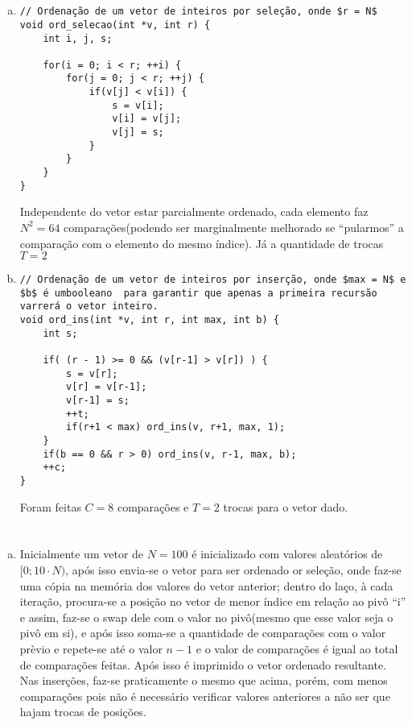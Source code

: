 \documentclass{article}
\begin{document}


\section{}
	\begin{enumerate}[a)]
		\item \mbox{}
			\begin{verbatim}
// Ordenação de um vetor de inteiros por seleção, onde $r = N$
void ord_selecao(int *v, int r) {
	int i, j, s;
				
	for(i = 0; i < r; ++i) {
		for(j = 0; j < r; ++j) {
			if(v[j] < v[i]) {
				s = v[i];
				v[i] = v[j];
				v[j] = s;
			}
		}
	}
}
			\end{verbatim}
			Independente do vetor estar parcialmente ordenado, cada elemento faz $N^2 = 64$ comparações(podendo ser marginalmente melhorado se ``pularmos'' a comparação com o elemento do mesmo índice). Já a quantidade de trocas $T = 2$
		\item \mbox{}
			\begin{verbatim}
// Ordenação de um vetor de inteiros por inserção, onde $max = N$ e $b$ é umbooleano  para garantir que apenas a primeira recursão varrerá o vetor inteiro.
void ord_ins(int *v, int r, int max, int b) {
	int s;

	if( (r - 1) >= 0 && (v[r-1] > v[r]) ) {
		s = v[r];
		v[r] = v[r-1];
		v[r-1] = s;
		++t;
		if(r+1 < max) ord_ins(v, r+1, max, 1);
	}
	if(b == 0 && r > 0) ord_ins(v, r-1, max, b);
	++c;
}
			\end{verbatim}
			Foram feitas $C = 8$ comparações e $T = 2$ trocas para o vetor dado.

	\end{enumerate}
\section{}
	\begin{enumerate}[a)]
		\item Inicialmente um vetor de $N = 100$ é inicializado com valores aleatórios de $[0; 10 \cdot N)$, após isso envia-se o vetor para ser ordenado or seleção, onde faz-se uma cópia na memória dos valores do vetor anterior; dentro do laço, à cada iteração, procura-se a posição no vetor de menor índice em relação ao pivô ``i'' e assim, faz-se o swap dele com o valor no pivô(mesmo que esse valor seja o pivô em si), e após isso soma-se a quantidade de comparações com o valor prèvio e repete-se até o valor $n - 1$ e o valor de comparações é igual ao total de comparações feitas. Após isso é imprimido o vetor ordenado resultante.
	Nas inserções, faz-se praticamente o mesmo que acima, porém, com menos comparações pois não é necessário verificar valores anteriores a não ser que hajam trocas de posições.
	\end{enumerate}
\end{document}
